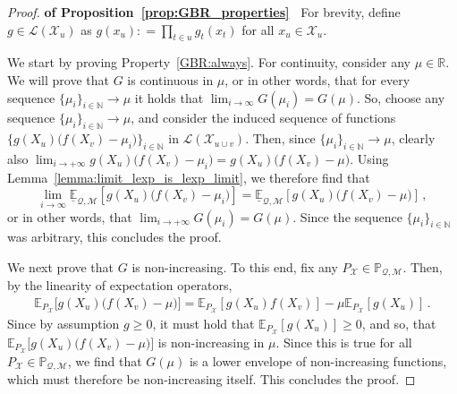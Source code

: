 \documentclass[twoside,11pt]{article}
\newcommand{\nats}{\mathbb{N}}
\newcommand{\reals}{\mathbb{R}}
\newcommand{\states}{\mathcal{X}}
\newcommand{\lexp}{\underline{\mathbb{E}}_{\rateset,\mathcal{M}}}
\newcommand{\gambles}{\mathcal{L}}
\newcommand{\rateset}{\mathcal{Q}}
\newcommand{\coloneqq}{:\!=}
\begin{document}
\begin{proof}{\bf of Proposition~\ref{prop:GBR_properties}~}
For brevity, define $g\in\gambles(\states_u)$ as $g(x_u)\coloneqq \prod_{t\in u} g_{t}(x_{t})$ for all $x_u\in\states_u$.

We start by proving Property~\ref{GBR:always}. For continuity, consider any $\mu\in\reals$. We will prove that $G$ is continuous in $\mu$, or in other words, that for every sequence $\{\mu_i\}_{i\in\nats}\to\mu$ it holds that $\lim_{i\to\infty}G(\mu_i)=G(\mu)$. So, choose any sequence $\{\mu_i\}_{i\in\nats}\to\mu$, and consider the induced sequence of functions $\bigl\{g(X_u)\bigl(f(X_v) - \mu_i\bigr)\bigr\}_{i\in\nats}$ in $\gambles(\states_{u\cup v})$. Then, since $\{\mu_i\}_{i\in\nats}\to\mu$, clearly also $\lim_{i\to+\infty}g(X_u)\bigl(f(X_v) - \mu_i\bigr)=g(X_u)\bigl(f(X_v) - \mu\bigr)$. Using Lemma~\ref{lemma:limit_lexp_is_lexp_limit}, we therefore find that
\begin{equation*}
\lim_{i\to\infty}\lexp[g(X_u)\bigl(f(X_v) - \mu_i\bigr)] = \lexp[g(X_u)\bigl(f(X_v) - \mu\bigr)]\,,
\end{equation*}
or in other words, that $\lim_{i\to+\infty}G(\mu_i) = G(\mu)$. Since the sequence $\{\mu_i\}_{i\in\nats}$ was arbitrary, this concludes the proof.

We next prove that $G$ is non-increasing. To this end, fix any $P_\states\in\mathbb{P}_{\rateset,\mathcal{M}}$. Then, by the linearity of expectation operators,
\begin{align}\label{eq:gbr_linear_expansion}
\mathbb{E}_{P_\states}\bigl[g(X_u)\bigl(f(X_v) - \mu\bigr)\bigr] = \mathbb{E}_{P_\states}[g(X_u)f(X_v)] - \mu\mathbb{E}_{P_\states}[g(X_u)]\,.
\end{align}
Since by assumption $g\geq 0$, it must hold that $\mathbb{E}_{P_\states}[g(X_u)]\geq 0$, and so, that $\mathbb{E}_{P_\states}\bigl[g(X_u)\bigl(f(X_v) - \mu\bigr)\bigr]$ is non-increasing in $\mu$. Since this is true for all ${P_\states}\in\mathbb{P}_{\rateset,\mathcal{M}}$, we find that $G(\mu)$ is a lower envelope of non-increasing functions, which must therefore be non-increasing itself. This concludes the proof.


\end{proof}
\end{document}
